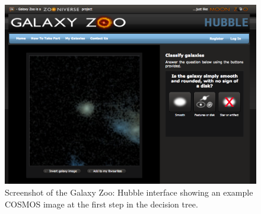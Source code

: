 \documentclass[twocolumn]{aastex6}
\begin{document}
\begin{figure}
\includegraphics[width=160mm]{figures/gzh_interface.png}
\caption{Screenshot of the Galaxy Zoo: Hubble interface showing an example COSMOS image at the first step in the decision tree.\label{fig:interface}}
\end{figure}
\end{document}
